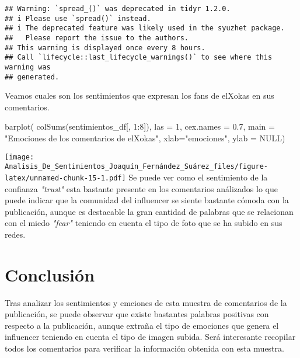 \documentclass[
]{article}
\newenvironment{Shaded}{\begin{snugshade}}{\end{snugshade}}
\newcommand{\AttributeTok}[1]{\textcolor[rgb]{0.77,0.63,0.00}{#1}}
\newcommand{\ConstantTok}[1]{\textcolor[rgb]{0.00,0.00,0.00}{#1}}
\newcommand{\DecValTok}[1]{\textcolor[rgb]{0.00,0.00,0.81}{#1}}
\newcommand{\FloatTok}[1]{\textcolor[rgb]{0.00,0.00,0.81}{#1}}
\newcommand{\FunctionTok}[1]{\textcolor[rgb]{0.00,0.00,0.00}{#1}}
\newcommand{\NormalTok}[1]{#1}
\newcommand{\OtherTok}[1]{\textcolor[rgb]{0.56,0.35,0.01}{#1}}
\newcommand{\SpecialCharTok}[1]{\textcolor[rgb]{0.00,0.00,0.00}{#1}}
\newcommand{\StringTok}[1]{\textcolor[rgb]{0.31,0.60,0.02}{#1}}
\begin{document}
\begin{Shaded}
\end{Shaded}

\begin{verbatim}
## Warning: `spread_()` was deprecated in tidyr 1.2.0.
## i Please use `spread()` instead.
## i The deprecated feature was likely used in the syuzhet package.
##   Please report the issue to the authors.
## This warning is displayed once every 8 hours.
## Call `lifecycle::last_lifecycle_warnings()` to see where this warning was
## generated.
\end{verbatim}

Veamos cuales son los sentimientos que expresan los fans de elXokas en
sus comentarios.

\begin{Shaded}
\begin{Highlighting}[]
\FunctionTok{barplot}\NormalTok{(}
  \FunctionTok{colSums}\NormalTok{(sentimientos\_df[, }\DecValTok{1}\SpecialCharTok{:}\DecValTok{8}\NormalTok{]),}
  \AttributeTok{las =} \DecValTok{1}\NormalTok{,}
  \AttributeTok{cex.names =} \FloatTok{0.7}\NormalTok{,}
  \AttributeTok{main =} \StringTok{"Emociones de los comentarios de elXokas"}\NormalTok{,}
  \AttributeTok{xlab=}\StringTok{"emociones"}\NormalTok{, }\AttributeTok{ylab =} \ConstantTok{NULL}\NormalTok{)}
\end{Highlighting}
\end{Shaded}

\texttt{[image: Analisis\_De\_Sentimientos\_Joaquín\_Fernández\_Suárez\_files/figure-latex/unnamed-chunk-15-1.pdf]}
Se puede ver como el sentimiento de la confianza \textit{"trust"} esta
bastante presente en los comentarios análizados lo que puede indicar que
la comunidad del influencer se siente bastante cómoda con la
publicación, aunque es destacable la gran cantidad de palabras que se
relacionan con el miedo \textit{"fear"} teniendo en cuenta el tipo de
foto que se ha subido en sus redes.

\hypertarget{conclusiuxf3n}{%
\section{Conclusión}\label{conclusiuxf3n}}

Tras analizar los sentimientos y emciones de esta muestra de comentarios
de la publicación, se puede observar que existe bastantes palabras
positivas con respecto a la publicación, aunque extraña el tipo de
emociones que genera el influencer teniendo en cuenta el tipo de imagen
subida. Será interesante recopilar todos los comentarios para verificar
la información obtenida con esta muestra.
\end{document}
